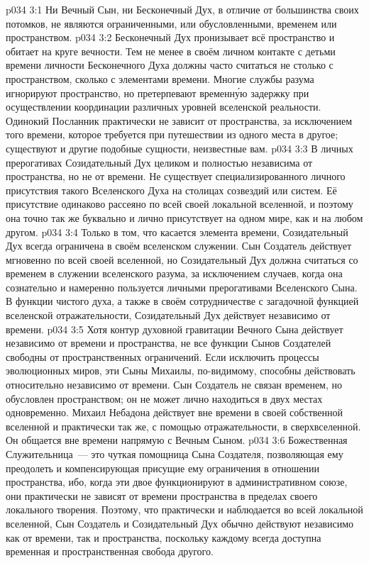 \vs p034 3:1 Ни Вечный Сын, ни Бесконечный Дух, в отличие от большинства своих потомков, не являются ограниченными, или обусловленными, временем или пространством.
\vs p034 3:2 Бесконечный Дух пронизывает всё пространство и обитает на круге вечности. Тем не менее в своём личном контакте с детьми времени личности Бесконечного Духа должны часто считаться не столько с пространством, сколько с элементами времени. Многие службы разума игнорируют пространство, но претерпевают временн\'ую задержку при осуществлении координации различных уровней вселенской реальности. Одинокий Посланник практически не зависит от пространства, за исключением того времени, которое требуется при путешествии из одного места в другое; существуют и другие подобные сущности, неизвестные вам.
\vs p034 3:3 \pc В личных прерогативах Созидательный Дух целиком и полностью независима от пространства, но не от времени. Не существует специализированного личного присутствия такого Вселенского Духа на столицах созвездий или систем. Её присутствие одинаково рассеяно по всей своей локальной вселенной, и поэтому она точно так же буквально и лично присутствует на одном мире, как и на любом другом.
\vs p034 3:4 Только в том, что касается элемента времени, Созидательный Дух всегда ограничена в своём вселенском служении. Сын Создатель действует мгновенно по всей своей вселенной, но Созидательный Дух должна считаться со временем в служении вселенского разума, за исключением случаев, когда она сознательно и намеренно пользуется личными прерогативами Вселенского Сына. В функции чистого духа, а также в своём сотрудничестве с загадочной функцией вселенской отражательности, Созидательный Дух действует независимо от времени.
\vs p034 3:5 \pc Хотя контур духовной гравитации Вечного Сына действует независимо от времени и пространства, не все функции Сынов Создателей свободны от пространственных ограничений. Если исключить процессы эволюционных миров, эти Сыны Михаилы, по\hyp{}видимому, способны действовать относительно независимо от времени. Сын Создатель не связан временем, но обусловлен пространством; он не может лично находиться в двух местах одновременно. Михаил Небадона действует вне времени в своей собственной вселенной и практически так же, с помощью отражательности, в сверхвселенной. Он общается вне времени напрямую с Вечным Сыном.
\vs p034 3:6 Божественная Служительница~--- это чуткая помощница Сына Создателя, позволяющая ему преодолеть и компенсирующая присущие ему ограничения в отношении пространства, ибо, когда эти двое функционируют в административном союзе, они практически не зависят от времени  пространства в пределах своего локального творения. Поэтому, что практически и наблюдается во всей локальной вселенной, Сын Создатель и Созидательный Дух обычно действуют независимо как от времени, так и пространства, поскольку каждому всегда доступна временная и пространственная свобода другого.
